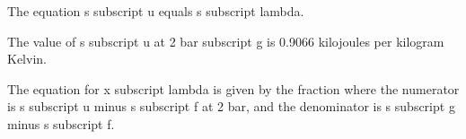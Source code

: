 The equation s subscript u equals s subscript lambda.

The value of s subscript u at 2 bar subscript g is 0.9066 kilojoules per kilogram Kelvin.

The equation for x subscript lambda is given by the fraction where the numerator is s subscript u minus s subscript f at 2 bar, and the denominator is s subscript g minus s subscript f.